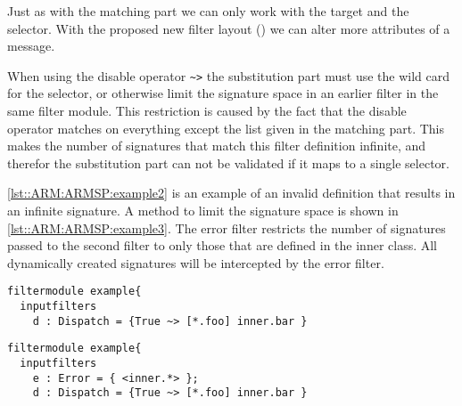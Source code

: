 Just as with the matching part we can only work with the target and the selector. 
With the proposed new filter layout (\cite{Doornenbal2006}) we can alter more attributes of a message.

When using the disable operator \lstinline[language=Composestar]|~>| the substitution part must use the wild card for the selector, or otherwise limit the signature space in an earlier filter in the same filter module. 
This restriction is caused by the fact that the disable operator matches on everything except the list given in the matching part. 
This makes the number of signatures that match this filter definition infinite, and therefor the substitution part can not be validated if it maps to a single selector. 

\autoref{lst::ARM:ARMSP:example2} is an example of an invalid definition that results in an infinite signature. 
A method to limit the signature space is shown in \autoref{lst::ARM:ARMSP:example3}. 
The error filter restricts the number of signatures passed to the second filter to only those that are defined in the inner class. All dynamically created signatures will be intercepted by the error filter.

\begin{lstlisting}[caption={Infinite signature definition},label=lst::ARM:ARMSP:example2,
style=listing,language =ComposeStar,float=tpb]
filtermodule example{
  inputfilters
    d : Dispatch = {True ~> [*.foo] inner.bar }
\end{lstlisting}

\begin{lstlisting}[caption={Limiting signature space},label=lst::ARM:ARMSP:example3,
style=listing,language =ComposeStar,float=tpb]
filtermodule example{
  inputfilters
    e : Error = { <inner.*> };
    d : Dispatch = {True ~> [*.foo] inner.bar }
\end{lstlisting}
